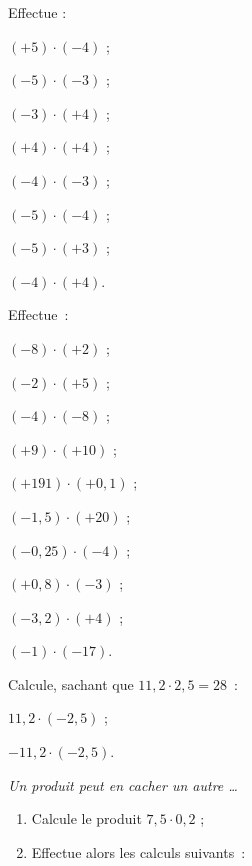 \begin{exercice}
Effectue :
\begin{colenumerate}{2}
 \item $(+5) \cdot (-4)$ ;
 \item $(-5) \cdot (-3)$ ;
 \item $(-3) \cdot (+4)$ ;
 \item $(+4) \cdot (+4)$ ;
 \item $(-4) \cdot (-3)$ ;
 \item $(-5) \cdot (-4)$ ;
 \item $(-5) \cdot (+3)$ ;
 \item $(-4) \cdot (+4)$.
 \end{colenumerate}
\end{exercice}


\begin{exercice}
Effectue :
\begin{colenumerate}{2}
 \item $(-8) \cdot (+2)$ ;
 \item $(-2) \cdot (+5) $ ;
 \item $(-4) \cdot (-8)$ ;
 \item $(+9) \cdot (+10)$ ; 
 \item $(+191) \cdot (+0,1)$ ; 
 \item $(-1,5) \cdot (+20)$ ;
 \item $(-0,25) \cdot (-4)$ ;
 \item $(+0,8) \cdot (-3)$ ;
 \item $(-3,2) \cdot (+4)$ ;
 \item \phantom{.} $(-1) \cdot (-17)$.
 \end{colenumerate}
\end{exercice}


\begin{exercice}
Calcule, sachant que $11,2 \cdot 2,5 = 28$ :
\begin{colenumerate}{2}
 \item $11,2 \cdot (-2,5)$ ;
 \item $-11,2 \cdot (-2,5)$.
 \end{colenumerate}
\end{exercice}


\begin{exercice}
\emph{Un produit peut en cacher un autre \ldots}
\begin{enumerate}
 \item Calcule le produit $7,5 \cdot 0,2$ ;
 \item Effectue alors les calculs suivants :
 \end{enumerate}
\end{exercice}


